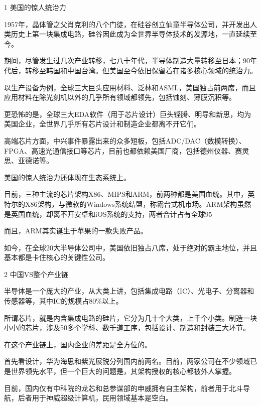\documentclass[utf8]{book}
\begin{document}
	\begin{flushleft}
		{\Large 1 美国的惊人统治力}
	\end{flushleft}

	1957年，晶体管之父肖克利的八个门徒，在硅谷创立仙童半导体公司，并开发出人类历史上第一块集成电路，硅谷因此成为全世界半导体技术的发源地，一直延续至今。

	期间，尽管发生过几次产业转移，七八十年代，半导体制造大量转移至日本；90年代后，转移至韩国和中国台湾。但美国至今依旧保留着在诸多核心领域的统治力。

	以生产设备为例，全球三大巨头应用材料、泛林和ASML，美国独占前两席，而且应用材料在除光刻机以外的几乎所有领域都领先，包括蚀刻、薄膜沉积等。

	更恐怖的是，全球三大EDA软件（用于芯片设计）巨头铿腾、明导和新思，均为美国企业，全世界几乎所有芯片设计和制造企业都离不开它们。

	高端芯片方面，中兴事件暴露出来的众多短板，包括ADC/DAC（数模转换）、FPGA、高速光通信接口等芯片，目前也都依赖美国厂商，包括德州仪器、赛灵思、亚德诺等。

	美国的惊人统治力还体现在生态系统上。

	目前，三种主流的芯片架构X86、MIPS和ARM，前两种都是美国血统。其中，英特尔的X86架构，与微软的Windows系统结盟，称霸台式机市场。ARM架构虽然是英国血统，却离不开安卓和iOS系统的支持，两者合计占有全球95%

	而且，ARM其实诞生于苹果的一款失败产品。

	如今，在全球20大半导体公司中，美国依旧独占八席，处于绝对的霸主地位，并且基本都是卡住核心的关键性公司。

	\begin{flushleft}
		{\Large 2 中国VS整个产业链}
	\end{flushleft}



	半导体是一个庞大的产业，从大类上讲，包括集成电路（IC）、光电子、分离器和传感器等，其中IC的规模占80\%以上。

	所谓芯片，就是内含集成电路的硅片，它分为几十个大类，上千个小类。制造一块小小的芯片，涉及50多个学科、数千道工序，包括设计、制造和封装三大环节。

	在这个产业链上，国内企业的差距是全方位的。

	首先看设计，华为海思和紫光展锐分列国内前两名。目前，两家公司在不少领域已是世界领先水平，但一个巨大的问题是，其架构授权的核心都被外人掌握。

	目前，国内仅有中科院的龙芯和总参谋部的申威拥有自主架构，前者用于北斗导航，后者用于神威超级计算机，民用领域基本是空白。
\end{document}
